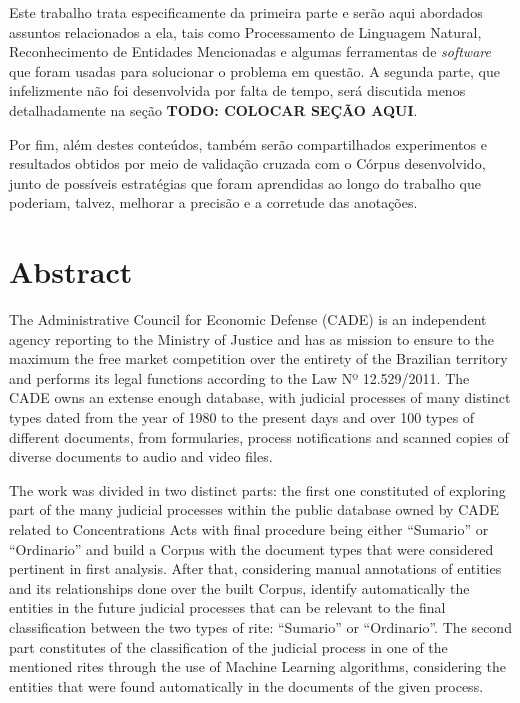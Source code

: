 \documentclass[11pt]{report}
\newcommand{\quotes}[1]{``#1''}
\begin{document}
Este trabalho trata especificamente da primeira parte e serão aqui abordados assuntos relacionados a ela, tais como Processamento de Linguagem Natural, Reconhecimento de Entidades
Mencionadas e algumas ferramentas de \textit{software} que foram usadas para solucionar o problema em questão. A segunda parte, que infelizmente não foi desenvolvida por falta de tempo,
será discutida menos detalhadamente na seção \textbf{TODO: COLOCAR SEÇÃO AQUI}.

Por fim, além destes conteúdos, também serão compartilhados experimentos e resultados obtidos por meio de validação cruzada com o Córpus desenvolvido, junto de possíveis estratégias que
foram aprendidas ao longo do trabalho que poderiam, talvez, melhorar a precisão e a corretude das anotações.

\pagebreak
\thispagestyle{empty}
\section*{Abstract}

\indent\indent The Administrative Council for Economic Defense (CADE) is an independent agency reporting to the Ministry of Justice and has as mission to ensure to the maximum the free
market competition over the entirety of the Brazilian territory and performs its legal functions according to the Law Nº 12.529/2011. The CADE owns an extense enough database, with
judicial processes of many distinct types dated from the year of 1980 to the present days and over 100 types of different documents, from formularies, process notifications and scanned
copies of diverse documents to audio and video files.

The work was divided in two distinct parts: the first one constituted of exploring part of the many judicial processes within the public database owned by CADE related to Concentrations
Acts with final procedure being either \quotes{Sumario} or \quotes{Ordinario} and build a Corpus with the document types that were considered pertinent in first analysis. After that,
considering manual annotations of entities and its relationships done over the built Corpus, identify automatically the entities in the future judicial processes that can be relevant to the
final classification between the two types of rite: \quotes{Sumario} or \quotes{Ordinario}. The second part constitutes of the classification of the judicial process in one of the
mentioned rites through the use of Machine Learning algorithms, considering the entities that were found automatically in the documents of the given process.
\end{document}
